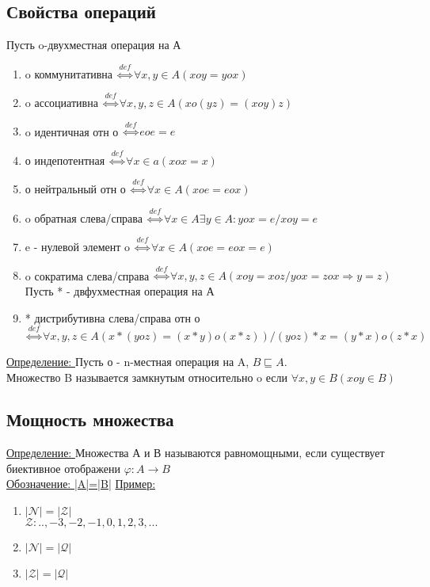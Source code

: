 \documentclass[12pt]{article}
\begin{document}
    \subsection*{Свойства операций}
    Пусть o-двухместная операция на А
    \begin{enumerate}
        \item o коммунитативна $\overset{def}{\Leftrightarrow} \forall x,y \in A(x o y = y o x)$
        \item o ассоциативна $\overset{def}{\Leftrightarrow} \forall x,y,z \in A (xo(yz)=(xoy)z)$
        \item o идентичная отн о $\overset{def}{\Leftrightarrow} e o e = e$
        \item о индепотентная $\overset{def}{\Leftrightarrow} \forall x \in a (x o x =x)$
        \item о нейтральный отн о $\overset{def}{\Leftrightarrow} \forall x \in A(x o e=eox)$
        \item o обратная слева/справа $\overset{def}{\Leftrightarrow} \forall x \in A \exists y \in A:yox=e/xoy=e$
        \item e - нулевой элемент o $\overset{def}{\Leftrightarrow} \forall x \in A(x o e=eox=e)$
        \item o сократима слева/справа $\overset{def}{\Leftrightarrow} \forall x,y,z \in A(xoy=xoz/yox=zox \Rightarrow y=z)$\\
        Пусть * - двфухместная операция на А
        \item * дистрибутивна слева/справа отн о $\overset{def}{\Leftrightarrow} \forall x,y,z \in A(x*(yoz)=(x*y)o(x*z))/
        (yoz)*x=(y*x)o(z*x)$
    \end{enumerate}
    \underline{Определение: } Пусть о - n-местная операция на A, $B \sqsubseteq A$.\\
    Множество B называется замкнутым относительно o если $\forall x,y \in B(xoy \in B)$
    \subsection{Мощность множества}
    \underline{Определение: } Множества А и В называются равномощными, если существует
    биективное отображени $\varphi: A\rightarrow B$\\
    \underline{Обозначение: |A|=|B|}
    \underline{Пример:}
    \begin{enumerate}
        \item $|\mathcal{N}| = |\mathcal{Z}|$\\
        $\mathcal{Z}: ..,-3,-2,-1,0,1,2,3,...$
        \item $|\mathcal{N}|=|\mathcal{Q}|$
        \item $|\mathcal{Z}|=|\mathcal{Q}|$
    \end{enumerate}
\end{document}
